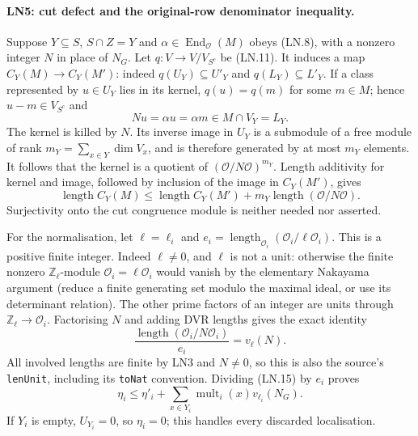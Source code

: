 \paragraph{LN5: cut defect and the original-row denominator inequality.}
\label{claim:LN5}
Suppose $Y\subseteq S$, $S\cap Z=Y$ and $\alpha\in
\operatorname{End}_{\mathcal O}(M)$ obeys (LN.8), with a nonzero
integer $N$ in place of $N_G$.  Let $q:V\to V/V_{S^c}$ be (LN.11).
It induces a map
$C_Y(M)\to C_Y(M')$: indeed $q(U_Y)\subseteq U'_Y$ and
$q(L_Y)\subseteq L'_Y$.  If a class represented by $u\in U_Y$
lies in its kernel, $q(u)=q(m)$ for some $m\in M$; hence
$u-m\in V_{S^c}$ and
\[
              Nu=\alpha u=\alpha m\in M\cap V_Y=L_Y.
 \tag{LN.14}
\]
The kernel is killed by $N$.  Its inverse image in $U_Y$ is a
submodule of a free module of rank $m_Y=\sum_{x\in Y}\dim V_x$,
and is therefore generated by at most $m_Y$ elements.  It follows
that the kernel is a quotient of $(\mathcal O/N\mathcal O)^{m_Y}$.
Length additivity for kernel and image, followed by inclusion of
the image in $C_Y(M')$, gives
\[
 \operatorname{length}C_Y(M)
 \le\operatorname{length}C_Y(M')+
               m_Y\operatorname{length}(\mathcal O/N\mathcal O).
 \tag{LN.15}
\]
Surjectivity onto the cut congruence module is neither needed nor
asserted.

For the normalisation, let $\ell=\ell_i$ and
$e_i=\operatorname{length}_{\mathcal O_i}(\mathcal O_i/\ell\mathcal O_i)$.
This is a positive finite integer.  Indeed $\ell\ne0$, and $\ell$
is not a unit: otherwise the finite nonzero
$\mathbb Z_\ell$-module $\mathcal O_i=\ell\mathcal O_i$ would
vanish by the elementary Nakayama argument (reduce a finite
generating set modulo the maximal ideal, or use its determinant
relation).  The other prime factors of an integer are units through
$\mathbb Z_\ell\to\mathcal O_i$.  Factorising $N$ and adding DVR
lengths gives the exact identity
\[
 \frac{\operatorname{length}(\mathcal O_i/N\mathcal O_i)}{e_i}
                   =v_\ell(N).                         \tag{LN.16}
\]
All involved lengths are finite by LN3 and $N\ne0$, so this is also
the source's \texttt{lenUnit}, including its \texttt{toNat}
convention.  Dividing (LN.15) by $e_i$ proves
\[
 \eta_i\le\eta'_i+
             \sum_{x\in Y_i}\operatorname{mult}_i(x)v_{\ell_i}(N_G).
 \tag{LN.17}
\]
If $Y_i$ is empty, $U_{Y_i}=0$, so $\eta_i=0$; this handles every
discarded localisation.

